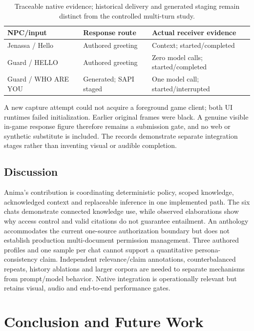 \documentclass[conference]{IEEEtran}
\begin{document}
\begin{table}[t]
\caption{Traceable native evidence; historical delivery and generated staging remain distinct from the controlled multi-turn study.}
\label{tab:native}
\centering\small\setlength{\tabcolsep}{3pt}
\begin{tabular}{>{\raggedright\arraybackslash}p{}>{\raggedright\arraybackslash}p{}>{\raggedright\arraybackslash}p{}}
\toprule
NPC/input & Response route & Actual receiver evidence \\
\midrule
Jenassa / Hello & Authored greeting & Context; started/completed \\
Guard / HELLO & Authored greeting & Zero model calls; started/completed \\
Guard / WHO ARE YOU & Generated; SAPI staged & One model call; started/interrupted \\
\bottomrule
\end{tabular}
\end{table}

A new capture attempt could not acquire a foreground game client; both UI runtimes failed initialization. Earlier original frames were black. A genuine visible in-game response figure therefore remains a submission gate, and no web or synthetic substitute is included. The records demonstrate separate integration stages rather than inventing visual or audible completion.

\subsection{Discussion}
Anima's contribution is coordinating deterministic policy, scoped knowledge, acknowledged context and replaceable inference in one implemented path. The six chats demonstrate connected knowledge use, while observed elaborations show why access control and valid citations do not guarantee entailment. An anthology accommodates the current one-source authorization boundary but does not establish production multi-document permission management. Three authored profiles and one sample per chat cannot support a quantitative persona-consistency claim. Independent relevance/claim annotations, counterbalanced repeats, history ablations and larger corpora are needed to separate mechanisms from prompt/model behavior. Native integration is operationally relevant but retains visual, audio and end-to-end performance gates.

\section{Conclusion and Future Work}
\end{document}
